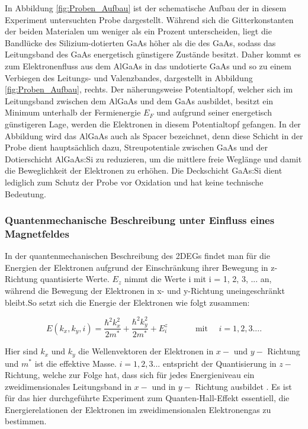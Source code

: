 In Abbildung \ref{fig:Proben_Aufbau} ist der schematische Aufbau der in diesem Experiment untersuchten Probe dargestellt. 
Während sich die Gitterkonstanten der beiden Materialen um weniger als ein Prozent unterscheiden, liegt die Bandlücke des  Silizium-dotierten GaAs  höher als die des GaAs, sodass das Leitungsband des GaAs energetisch günstigere Zustände besitzt. Daher kommt es zum Elektronenfluss aus dem AlGaAs in das undotierte GaAs und so zu einem Verbiegen des Leitungs- und Valenzbandes, dargestellt in Abbildung \ref{fig:Proben_Aufbau}, rechts.
Der näherungsweise Potentialtopf, welcher sich im Leitungsband zwischen dem AlGaAs und dem GaAs ausbildet, besitzt ein Minimum unterhalb der Fermienergie $E_F$ und aufgrund seiner energetisch günstigeren Lage, werden die Elektronen in diesem Potentialtopf gefangen. 
In der Abbildung wird das AlGaAs auch als Spacer bezeichnet, denn diese Schicht in der Probe dient hauptsächlich dazu, Streupotentiale zwischen GaAs und der Dotierschicht AlGaAs:Si zu reduzieren, um die mittlere freie Weglänge und damit die Beweglichkeit der Elektronen zu erhöhen. Die Deckschicht GaAs:Si dient lediglich zum Schutz der Probe vor Oxidation und hat keine technische Bedeutung. 

\subsubsection{Quantenmechanische Beschreibung unter Einfluss eines Magnetfeldes}
In der quantenmechanischen Beschreibung des 2DEGs findet man für die Energien der Elektronen aufgrund der Einschränkung ihrer Bewegung in z-Richtung quantisierte Werte. $E_z$ nimmt die Werte i mit i = 1, 2, 3, ... an, während die Bewegung der Elektronen in x- und y-Richtung uneingeschränkt bleibt.So setzt sich die Energie der Elektronen wie folgt zusammen:

\begin{equation}
E(k_x,k_y,i)=\frac{\hbar^2k_x^2}{2m^*}+\frac{\hbar^2k_y^2}{2m^*}+E_i^z   \text{~~~~~~~~~ mit ~~~} i=1,2,3....
\label{eq:energie_2DEG}
\end{equation}

Hier sind $k_x$ und $k_y$ die Wellenvektoren der Elektronen in $x -$ und $y-$ Richtung und $m^*$ ist die effektive Masse. $i = 1,2,3...$  entspricht der Quantisierung in $z-$ Richtung, welche zur Folge hat, dass sich für jedes Energieniveau ein zweidimensionales  Leitungsband in $x-$ und in $y-$ Richtung ausbildet \cite[Kap. 3.6]{kopitzki_einfuhrung_2009}. 
Es ist für das hier durchgeführte Experiment zum Quanten-Hall-Effekt essentiell, die Energierelationen der Elektronen im zweidimensionalen Elektronengas zu bestimmen. 

